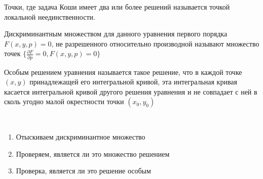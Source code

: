 \documentclass[document.tex]{subfiles}
\begin{document}
\begin{definition}
    Точки, где задача Коши имеет два или более решений называется точкой локальной неединственности.
\end{definition}

\begin{definition}
    Дискриминантным множеством для данного уравнения первого порядка $F(x, y, p) = 0$, не разрешенного относительно производной называют
    множество точек $\{\frac{\partial F}{\partial p} = 0, F(x, y, p) = 0\}$
\end{definition}

\begin{definition}
    Особым решением уравнения называется такое решение, что в каждой точке $(x, y)$ принадлежащей его интегральной
    кривой, эта интегральная кривая касается интегральной кривой другого решения уравнения и не совпадает с ней в сколь
    угодно малой окрестности точки $(x_0, y_0)$
\end{definition}

\begin{algorithm}
    ~\begin{enumerate}
        \item Отыскиваем дискриминантное множество
        \item Проверяем, является ли это множество решением
        \item Проверка, является ли это решение особым
    \end{enumerate}
\end{algorithm}
\end{document}

